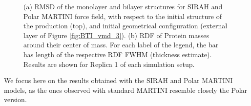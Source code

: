 \begin{figure}[h!]
\begin{minipage}[c]{0.5\textwidth}
    \end{minipage}
    \begin{minipage}[c]{0.44\textwidth}
    \end{minipage}
    \caption[Comparison of structural properties between monolayer and bilayer structures]{(a) RMSD of the monolayer and bilayer structures for SIRAH and Polar MARTINI force field, with respect to the initial structure of the production (top), and initial geometrical configuration (external layer of Figure \ref{fig:BTI_vmd_3}). (b) RDF of Protein masses around their center of mass. For each label of the legend, the bar has length of the respective RDF FWHM (thickness estimate). Results are shown for Replica 1 of each simulation setup.}
\label{fig:mono_bi}
\end{figure}
We focus here on the results obtained with the SIRAH and Polar MARTINI models, as the ones observed with standard MARTINI resemble closely the Polar version.

